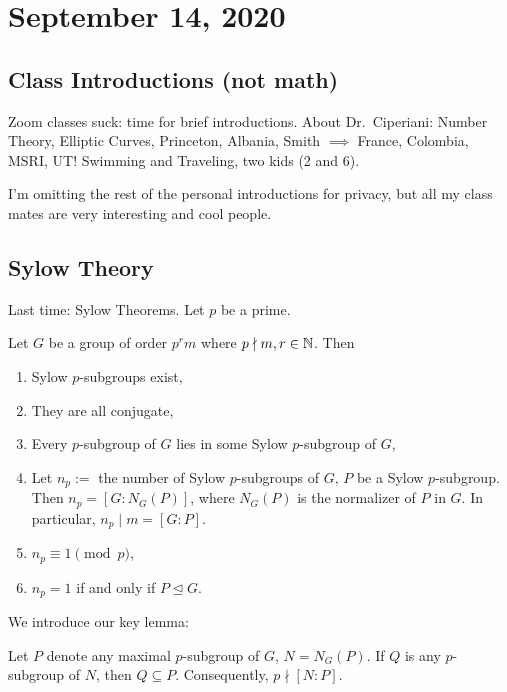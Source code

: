 \section{September 14, 2020}
\subsection{Class Introductions (not math)}

Zoom classes suck: time for brief introductions. About Dr.\ Ciperiani: Number Theory, Elliptic Curves, Princeton, Albania, Smith $\implies $ France, Colombia, MSRI, UT! Swimming and Traveling, two kids (2 and 6).

I'm omitting the rest of the personal introductions for privacy, but all my class mates are very interesting and cool people.

\subsection{Sylow Theory}
Last time: Sylow Theorems. Let $p$ be a prime.
\begin{theorem}
    Let $G$ be a group of order $p^{r}m$ where $p \nmid m, r\in \mathbb{N}$. Then
    \begin{enumerate}
        \item Sylow $p$-subgroups exist,
        \item They are all conjugate,
        \item Every $p$-subgroup of $G$ lies in some Sylow $p$-subgroup of $G$,
        \item Let $n_p:=$ the number of Sylow $p$-subgroups of $G$, $P$ be a Sylow $p$-subgroup. Then $n_p=[G:N_G(P)]$, where $N_G(P)$ is the normalizer of $P$ in $G$. In particular, $n_p  \mid m = [G:P]$.
\item $n_p \equiv 1 \pmod p$,
        \item $n_p = 1$ if and only if $P \trianglelefteq G$.
    \end{enumerate}
\end{theorem}
We introduce our key lemma:
\begin{lemma}
    Let $P$ denote any maximal $p$-subgroup of $G$, $N=N_G(P) $. If $Q$ is any $p$-subgroup of $N$, then $Q \subseteq P$. Consequently, $p \nmid [N:P]$.
\end{lemma}

